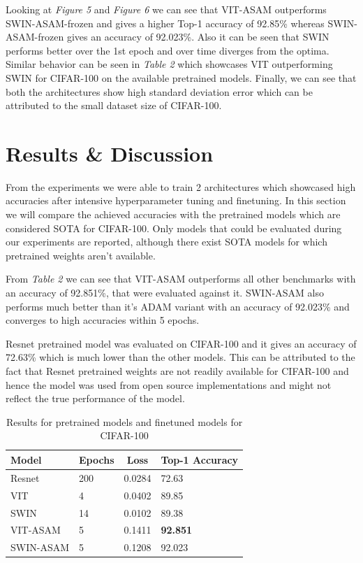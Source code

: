 \documentclass{article}
\begin{document}
Looking at \textit{Figure 5} and \textit{Figure 6} we can see that VIT-ASAM outperforms SWIN-ASAM-frozen and gives a higher Top-1 accuracy of 92.85\% whereas SWIN-ASAM-frozen gives an accuracy of 92.023\%.
Also it can be seen that SWIN performs better over the 1st epoch and over time diverges from the optima.
Similar behavior can be seen in \textit{Table 2} which showcases VIT outperforming SWIN for CIFAR-100 on the available pretrained models.
Finally, we can see that both the architectures show high standard deviation error which can be attributed to the small dataset size of CIFAR-100.


\section{Results \& Discussion}
From the experiments we were able to train 2 architectures which showcased high accuracies after intensive hyperparameter tuning and finetuning.
In this section we will compare the achieved accuracies with the pretrained models which are considered SOTA for CIFAR-100.
Only models that could be evaluated during our experiments are reported, although there exist SOTA models for which pretrained weights aren't available.

From \textit{Table 2} we can see that VIT-ASAM outperforms all other benchmarks with an accuracy of 92.851\%, that were evaluated against it.
SWIN-ASAM also performs much better than it's ADAM variant with an accuracy of 92.023\% and converges to high accuracies within 5 epochs.

Resnet pretrained model was evaluated on CIFAR-100 and it gives an accuracy of 72.63\% which is much lower than the other models.
This can be attributed to the fact that Resnet pretrained weights are not readily available for CIFAR-100 and hence the model was used from open source implementations and might not reflect the true performance of the model.

\begin{table}[ht]
    \begin{tabular}{|l|l|c|l|}
        \hline
        \textbf{Model} & \textbf{Epochs} & \textbf{Loss} & \textbf{Top-1 Accuracy} \\ \hline
        Resnet         & 200             & 0.0284        & 72.63                   \\ \hline
        VIT            & 4               & 0.0402        & 89.85                   \\ \hline
        SWIN           & 14              & 0.0102        & 89.38                   \\ \hline
        VIT-ASAM       & 5               & 0.1411        & \textbf{92.851}         \\ \hline
        SWIN-ASAM      & 5               & 0.1208        & 92.023                  \\ \hline
    \end{tabular}
    \caption{Results for pretrained models and finetuned models for CIFAR-100}
\end{table}
\end{document}
